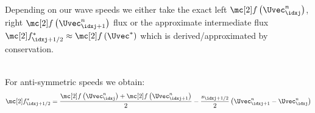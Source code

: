 \begin{explanationbox}\nospacing
    \begin{explanation}
        Depending on our wave speeds we either take the exact left $\flux\left(\Uvec_{\idxj}^{n}\right)$, right $\flux\left(\Uvec_{\idxj+1}^{n}\right)$ flux or the approximate intermediate flux $\flux^{*}_{\idxj+1/2}\approx\flux\left(\Uvec^{*}\right)$
        which is derived/approximated by conservation.\\
        \begin{minipage}[t]{0.32\textwidth}
            \begin{figure}[H]
                \centering{
                  \def\svgwidth{100pt}
                  \resizebox{\linewidth}{!}{
                    }
                }
            \end{figure}
        \end{minipage}
        \begin{minipage}[t]{0.32\textwidth}
            \begin{figure}[H]
                \centering{
                  \def\svgwidth{100pt}
                  \resizebox{\linewidth}{!}{
                    }
                }
            \end{figure}
        \end{minipage}
        \begin{minipage}[t]{0.32\textwidth}
            \begin{figure}[H]
                \centering{
                  \def\svgwidth{100pt}
                  \resizebox{\linewidth}{!}{
                    }
                }
            \end{figure}
        \end{minipage}
    \end{explanation}
\end{explanationbox}
\begin{corbox}\nospacing
    \begin{cor}[\hfill\tcblack{$-s^{l}_{\idxj+1/2}=s^{r}_{\idxj+1/2}=:s_{\idxj+1/2}$}\newline Symmetric Waves]\label{cor:symmetric_waves_non_linear_cystems}\leavevmode\\
        For anti-symmetric speeds we obtain:
        \begin{align}
          \flux^{*}_{\idxj+1/2}=\frac{\flux\left(\Uvec_{\idxj}^{n}\right)+\flux \left(\Uvec_{\idxj+1}^{n}\right)}{2}-\frac{s_{\idxj+1/2}}{2}\left(\Uvec_{\idxj+1}^{n}-\Uvec_{\idxj}^{n}\right)\label{eq:hll_symmetric_waves_systems}
        \end{align}
    \end{cor}
\end{corbox}
